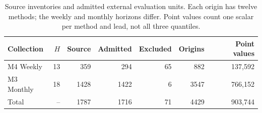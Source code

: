 \begin{table}[htbp]\centering\small
\caption{Source inventories and admitted external evaluation units. Each origin has twelve methods; the weekly and monthly horizons differ. Point values count one scalar per method and lead, not all three quantiles.}
\label{tab:collection-inventory}
\begin{tabular}{lrrrrrr}\toprule
Collection & $H$ & Source & Admitted & Excluded & Origins & Point values\\\midrule
M4 Weekly & 13 & 359 & 294 & 65 & 882 & 137,592\\
M3 Monthly & 18 & 1428 & 1422 & 6 & 3547 & 766,152\\
Total & -- & 1787 & 1716 & 71 & 4429 & 903,744\\\bottomrule
\end{tabular}\end{table}
